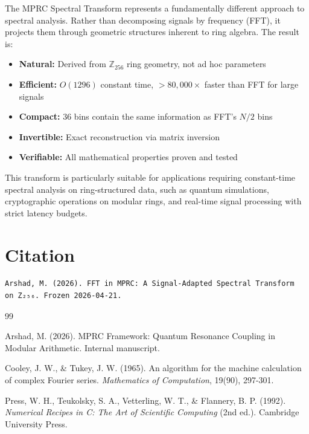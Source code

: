 \documentclass[12pt,a4paper]{article}
\theoremstyle{definition}
\begin{document}
The MPRC Spectral Transform represents a fundamentally different approach to spectral analysis. Rather than decomposing signals by frequency (FFT), it projects them through geometric structures inherent to ring algebra. The result is:

\begin{itemize}
    \item \textbf{Natural:} Derived from $\mathbb{Z}_{256}$ ring geometry, not ad hoc parameters
    \item \textbf{Efficient:} $O(1296)$ constant time, $>80{,}000\times$ faster than FFT for large signals
    \item \textbf{Compact:} 36 bins contain the same information as FFT's $N/2$ bins
    \item \textbf{Invertible:} Exact reconstruction via matrix inversion
    \item \textbf{Verifiable:} All mathematical properties proven and tested
\end{itemize}

This transform is particularly suitable for applications requiring constant-time spectral analysis on ring-structured data, such as quantum simulations, cryptographic operations on modular rings, and real-time signal processing with strict latency budgets.

\section*{Citation}

\begin{verbatim}
Arshad, M. (2026). FFT in MPRC: A Signal-Adapted Spectral Transform 
on Z₂₅₆. Frozen 2026-04-21.
\end{verbatim}

\begin{thebibliography}{99}

 Arshad, M. (2026). MPRC Framework: Quantum Resonance 
Coupling in Modular Arithmetic. Internal manuscript.

 Cooley, J. W., \& Tukey, J. W. (1965). An algorithm 
for the machine calculation of complex Fourier series. \textit{Mathematics 
of Computation}, 19(90), 297-301.

 Press, W. H., Teukolsky, S. A., Vetterling, W. T., 
\& Flannery, B. P. (1992). \textit{Numerical Recipes in C: The Art of 
Scientific Computing} (2nd ed.). Cambridge University Press.

\end{thebibliography}
\end{document}
